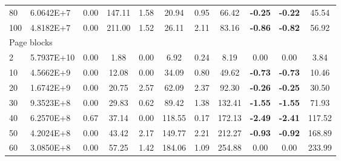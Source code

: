 {\begin{longtable}{@{}llccccccccc@{}}
\multicolumn{1}{l|}{80}  & \multicolumn{1}{l|}{6.0642E+7}  & 0.00 & \multicolumn{1}{c|}{147.11}  & 1.58 & \multicolumn{1}{c|}{20.94}   & 0.95 & \multicolumn{1}{c|}{66.42}   & \textbf{-0.25} & \textbf{-0.22} & 45.54   \\
\multicolumn{1}{l|}{100} & \multicolumn{1}{l|}{4.8182E+7}  & 0.00 & \multicolumn{1}{c|}{211.00}  & 1.52 & \multicolumn{1}{c|}{26.11}   & 2.11 & \multicolumn{1}{c|}{83.16}   & \textbf{-0.86} & \textbf{-0.82} & 56.92   \\ \hline
\multicolumn{11}{l}{Page blocks}                                                                                                                                                                                         \\ \hline
\multicolumn{1}{l|}{2}   & \multicolumn{1}{l|}{5.7937E+10} & 0.00 & \multicolumn{1}{c|}{1.88}    & 0.00 & \multicolumn{1}{c|}{6.92}    & 0.24 & \multicolumn{1}{c|}{8.19}    & 0.00           & 0.00           & 3.84    \\
\multicolumn{1}{l|}{10}  & \multicolumn{1}{l|}{4.5662E+9}  & 0.00 & \multicolumn{1}{c|}{12.08}   & 0.00 & \multicolumn{1}{c|}{34.09}   & 0.80 & \multicolumn{1}{c|}{49.62}   & \textbf{-0.73} & \textbf{-0.73} & 10.46   \\
\multicolumn{1}{l|}{20}  & \multicolumn{1}{l|}{1.6742E+9}  & 0.00 & \multicolumn{1}{c|}{20.75}   & 2.57 & \multicolumn{1}{c|}{62.09}   & 2.37 & \multicolumn{1}{c|}{92.30}   & \textbf{-0.26} & \textbf{-0.25} & 30.50   \\
\multicolumn{1}{l|}{30}  & \multicolumn{1}{l|}{9.3523E+8}  & 0.00 & \multicolumn{1}{c|}{29.83}   & 0.62 & \multicolumn{1}{c|}{89.42}   & 1.38 & \multicolumn{1}{c|}{132.41}  & \textbf{-1.55} & \textbf{-1.55} & 71.93   \\
\multicolumn{1}{l|}{40}  & \multicolumn{1}{l|}{6.2570E+8}  & 0.67 & \multicolumn{1}{c|}{37.14}   & 0.00 & \multicolumn{1}{c|}{118.55}  & 0.17 & \multicolumn{1}{c|}{172.13}  & \textbf{-2.49} & \textbf{-2.41} & 117.52  \\
\multicolumn{1}{l|}{50}  & \multicolumn{1}{l|}{4.2024E+8}  & 0.00 & \multicolumn{1}{c|}{43.42}   & 2.17 & \multicolumn{1}{c|}{149.77}  & 2.21 & \multicolumn{1}{c|}{212.27}  & \textbf{-0.93} & \textbf{-0.92} & 168.89  \\
\multicolumn{1}{l|}{60}  & \multicolumn{1}{l|}{3.0850E+8}  & 0.00 & \multicolumn{1}{c|}{57.25}   & 1.42 & \multicolumn{1}{c|}{184.06}  & 1.09 & \multicolumn{1}{c|}{254.88}  & 0.00           & 0.00           & 233.99  \\

\end{longtable}}
